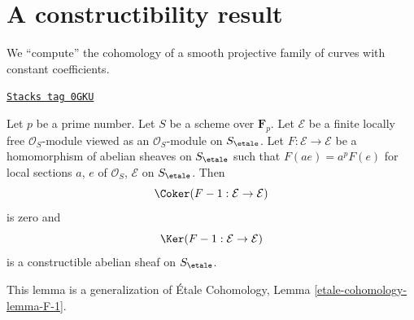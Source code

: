 \section{A constructibility result}
\label{more-etale-section-family-smooth-curves-cohomology}
We ``compute'' the cohomology of a smooth projective
family of curves with constant coefficients.

\begin{lemma}
\label{more-etale-lemma-frobenius-linear-on-vb}
\href{https://stacks.math.columbia.edu/tag/0GKU}{\texttt{Stacks tag 0GKU}}

Let $p$ be a prime number. Let $S$ be a scheme over $\mathbf{F}_p$.
Let $\mathcal{E}$ be a finite locally free
$\mathcal{O}_S$-module viewed as an $\mathcal{O}_S$-module on $S_\etale$.
Let $F : \mathcal{E} \to \mathcal{E}$ be a homomorphism of abelian sheaves
on $S_\etale$ such that $F(a e) = a^pF(e)$ for local sections $a$, $e$
of $\mathcal{O}_S$, $\mathcal{E}$ on $S_\etale$. Then
$$
\Coker(F - 1 : \mathcal{E} \to \mathcal{E})
$$
is zero and
$$
\Ker(F - 1 : \mathcal{E} \to \mathcal{E})
$$
is a constructible abelian sheaf on $S_\etale$.
\end{lemma}

This lemma is a generalization of \'Etale Cohomology, Lemma
\ref{etale-cohomology-lemma-F-1}.

